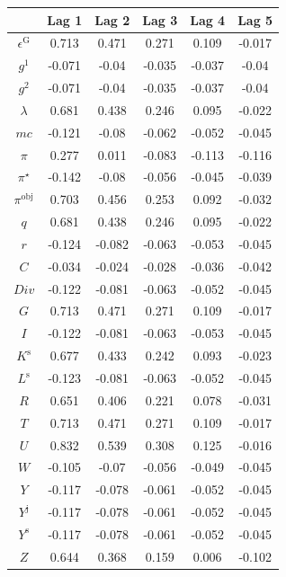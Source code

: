 \begin{tabular}{c|ccccc|}
  & Lag 1 & Lag 2 & Lag 3 & Lag 4 & Lag 5\\
\hline
$\epsilon^{\mathrm{G}}$ & 0.713 & 0.471 & 0.271 & 0.109 & -0.017 \\
$g^{\mathrm{1}}$ & -0.071 & -0.04 & -0.035 & -0.037 & -0.04 \\
$g^{\mathrm{2}}$ & -0.071 & -0.04 & -0.035 & -0.037 & -0.04 \\
$\lambda$ & 0.681 & 0.438 & 0.246 & 0.095 & -0.022 \\
${m\!c}$ & -0.121 & -0.08 & -0.062 & -0.052 & -0.045 \\
$\pi$ & 0.277 & 0.011 & -0.083 & -0.113 & -0.116 \\
$\pi^{\star}$ & -0.142 & -0.08 & -0.056 & -0.045 & -0.039 \\
$\pi^{\mathrm{obj}}$ & 0.703 & 0.456 & 0.253 & 0.092 & -0.032 \\
$q$ & 0.681 & 0.438 & 0.246 & 0.095 & -0.022 \\
$r$ & -0.124 & -0.082 & -0.063 & -0.053 & -0.045 \\
$C$ & -0.034 & -0.024 & -0.028 & -0.036 & -0.042 \\
${D\!i\!v}$ & -0.122 & -0.081 & -0.063 & -0.052 & -0.045 \\
$G$ & 0.713 & 0.471 & 0.271 & 0.109 & -0.017 \\
$I$ & -0.122 & -0.081 & -0.063 & -0.053 & -0.045 \\
$K^{\mathrm{s}}$ & 0.677 & 0.433 & 0.242 & 0.093 & -0.023 \\
$L^{\mathrm{s}}$ & -0.123 & -0.081 & -0.063 & -0.052 & -0.045 \\
$R$ & 0.651 & 0.406 & 0.221 & 0.078 & -0.031 \\
$T$ & 0.713 & 0.471 & 0.271 & 0.109 & -0.017 \\
$U$ & 0.832 & 0.539 & 0.308 & 0.125 & -0.016 \\
$W$ & -0.105 & -0.07 & -0.056 & -0.049 & -0.045 \\
$Y$ & -0.117 & -0.078 & -0.061 & -0.052 & -0.045 \\
$Y^{\mathrm{j}}$ & -0.117 & -0.078 & -0.061 & -0.052 & -0.045 \\
$Y^{\mathrm{s}}$ & -0.117 & -0.078 & -0.061 & -0.052 & -0.045 \\
$Z$ & 0.644 & 0.368 & 0.159 & 0.006 & -0.102 \\
\hline
\end{tabular}



